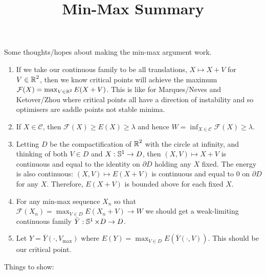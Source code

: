 \documentclass[12pt]{article}
\title{Min-Max Summary}
\date{}
\begin{document}
\maketitle

Some thoughts/hopes about making the min-max argument work.

\begin{enumerate}
\item If we take our continuous family to be all translations, $X \mapsto X + V$ for $V \in \operatorname{\mathbb{R}}^2$, then we know critical points will achieve the maximum $\mathcal{F} (X) = \max_{V \in \operatorname{\mathbb{R}}^2} E(X + V)$. This is like for Marques/Neves and Ketover/Zhou where critical points all have a direction of instability and so optimisers are saddle points not stable minima.

\item If $X \in \mathcal{C}$, then $\mathcal{F}(X) \geq E(X) \geq \lambda$ and hence $W = \inf_{X \in \mathcal{C}} \mathcal{F} (X) \geq \lambda$.

\item Letting $D$ be the compactification of $\operatorname{\mathbb{R}}^2$ with the circle at infinity, and thinking of both $V \in D$ and $X : \operatorname{\mathbb{S}^1} \to D$, then $(X, V) \mapsto X + V$ is continuous and equal to the identity on $\partial D$ holding any $X$ fixed. The energy is also continuous: $(X, V) \mapsto E(X + V)$ is continuous and equal to $0$ on $\partial D$ for any $X$. Therefore, $E(X + V)$ is bounded above for each fixed $X$.

\item For any min-max sequence $X_n$ so that $\mathcal{F} (X_n) = \max_{V \in D} E (X_n + V) \to W$ we should get a weak-limiting continuous family $\bar{Y} : \operatorname{\mathbb{S}^1} \times D \to D$.

\item Let $Y = \bar{Y}(\cdot, V_{\max})$ where $E(Y) = \max_{V \in D} E(\bar{Y}(\cdot, V))$. This should be our critical point.
\end{enumerate}

Things to show:
\end{document}
